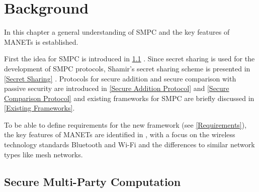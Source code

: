 \chapter{Background} \label{Background}



	In this chapter a general understanding of \gls{SMPC} and the key features of \glspl{MANET} is established.  
	
	First the idea for \gls{SMPC} is introduced in \ref{Secure Multi-Party Computation} . Since secret sharing is used for the development of \gls{SMPC} protocols, Shamir's secret sharing scheme is presented in \ref{Secret Sharing} .
	Protocols for secure addition and secure comparison with passive security are introduced in \ref{Secure Addition Protocol} and \ref{Secure Comparison Protocol} and existing frameworks for \gls{SMPC} are briefly discussed in \ref{Existing Frameworks}.
	
	To be able to define requirements for the new framework (see \ref{Requirements}), the key features of \glspl{MANET} are identified in , with a focus on the wireless technology standards Bluetooth and Wi-Fi and the differences to similar network types like mesh networks.
	
	
	\section{Secure Multi-Party Computation} \label{Secure Multi-Party Computation}
	

